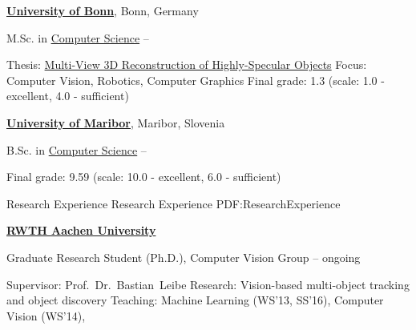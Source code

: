 \documentclass[letterpaper,MMMyyyy,nonstopmode]{simpleresumecv}
\begin{document}
\begin{Body}


\BigGap
\Entry
\href{https://www.uni-bonn.de/}
{\textbf{University of Bonn}},
Bonn, Germany

\Gap
\BulletItem
M.Sc. in
\href{https://www.informatik.uni-bonn.de/de/fuer-studierende/master-of-science-in-computer-science}
{Computer Science}
\hfill
{} --
\begin{Detail}
\SubBulletItem
Thesis:
\href{https://www.vision.rwth-aachen.de/media/papers/thesis_doc.pdf}
{Multi-View 3D Reconstruction of Highly-Specular Objects}
\SubBulletItem
Focus:
Computer Vision, Robotics, Computer Graphics
%
\SubBulletItem
Final grade: 1.3 (scale: 1.0 - excellent, 4.0 - sufficient)
\end{Detail}


\BigGap
\Entry
\href{https://www.um.si}
{\textbf{University of Maribor}},
Maribor, Slovenia

\Gap
\BulletItem
B.Sc. in
\href{https://feri.um.si/en/}
{Computer Science}
\hfill
{} --
\begin{Detail}
\SubBulletItem
Final grade: 9.59 (scale: 10.0 - excellent, 6.0 - sufficient)
\end{Detail}


\Section
{Research Experience}
{Research Experience}
{PDF:ResearchExperience}

\Entry
\href{http://www.rwth-aachen.de}
{\textbf{RWTH Aachen University}}

\Gap
\BulletItem
Graduate Research Student (Ph.D.), Computer Vision Group
\hfill
{} -- ongoing
\begin{Detail}
\SubBulletItem
Supervisor:
Prof.~Dr.~Bastian~Leibe
\SubBulletItem
Research:
Vision-based multi-object tracking and object discovery
\SubBulletItem
Teaching: Machine Learning (WS'13, SS'16), Computer Vision (WS'14), 
\end{Detail}


\end{Body}
\end{document}
